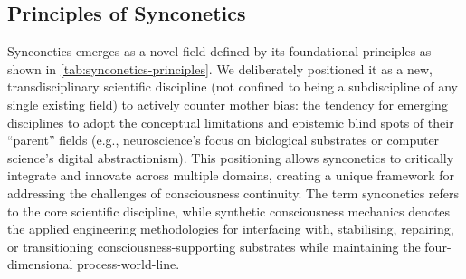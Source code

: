 \documentclass[10pt]{article}
\begin{document}
\begin{sloppypar}
  \subsection{Principles of Synconetics}
  \label{sec:principles}

  Synconetics emerges as a novel field defined by its foundational principles as shown in \autoref{tab:synconetics-principles}. We deliberately positioned it as a new, transdisciplinary scientific discipline (not confined to being a subdiscipline of any single existing field) to actively counter mother bias: the tendency for emerging disciplines to adopt the conceptual limitations and epistemic blind spots of their “parent” fields (e.g., neuroscience’s focus on biological substrates or computer science’s digital abstractionism). This positioning allows synconetics to critically integrate and innovate across multiple domains, creating a unique framework for addressing the challenges of consciousness continuity. The term synconetics refers to the core scientific discipline, while synthetic consciousness mechanics denotes the applied engineering methodologies for interfacing with, stabilising, repairing, or transitioning consciousness-supporting substrates while maintaining the four-dimensional process-world-line.


\end{sloppypar}
\end{document}
